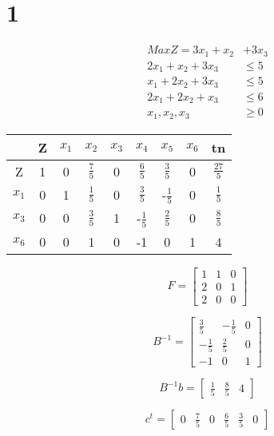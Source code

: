 \section{1}

\begin{align*}
    Max Z = 3x_1 + x_2  &+ 3x_3 \\
    2x_1 + x_2 + 3x_3 &\leq 5 \\
    x_1 + 2x_2 + 3x_3 &\leq 5 \\
    2x_1 + 2x_2 + x_3 &\leq 6 \\
    x_1,x_2,x_3 &\geq 0
\end{align*}

\begin{center}
    \begin{tabular}{||c c c c c c c c c||}
        \hline
        & Z & $x_1$ & $x_2$ & $x_3$ & $x_4$ & $x_5$ & $x_6$ & tn \\
        \hline
        Z & 1 & 0 & $\frac {7} {5}$ & 0 & $\frac {6} {5}$ & $\frac {3} {5}$ & 0 & $\frac {27} {5}$ \\
        $x_1$ & 0 & 1 & $\frac 1 5$ & 0 & $\frac 3 5$ & -$\frac 1 5$ & 0 & $\frac 1 5$ \\
        $x_3$ & 0 & 0 & $\frac 3 5$ & 1 & -$\frac 1 5$ & $\frac 2 5$ & 0 & $\frac 8 5$ \\
        $x_6$ & 0 & 0 & 1 & 0 & -1 & 0 & 1 & 4 \\
        \hline
    \end{tabular}
\end{center}

\[
    F = 
    \begin{bmatrix}
        1 & 1 & 0 \\
        2 & 0 & 1 \\
        2 & 0 & 0
    \end{bmatrix}
\]

\[
    B^{-1} = 
    \begin{bmatrix}
          \frac 3 5 & - \frac 1 5 & 0 \\
        - \frac 1 5 &   \frac 2 5 & 0 \\
        - 1         & 0           & 1
    \end{bmatrix}
\]

\[
    B^{-1}b =
    \begin{bmatrix}
        \frac 1 5 & \frac 8 5 & 4
    \end{bmatrix}
\]

\[
    c^t =
    \begin{bmatrix}
        0 & \frac 7 5 & 0 & \frac 6 5 & \frac 3 5 & 0
    \end{bmatrix}
\]

